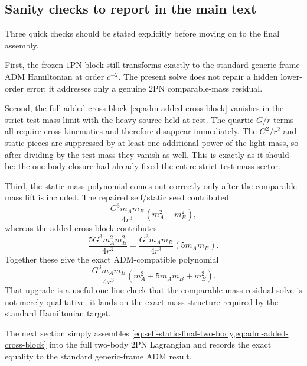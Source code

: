 \documentclass[11pt]{article}
\newcommand{\OnePN}{\mathrm{1PN}}
\newcommand{\TwoPN}{\mathrm{2PN}}
\newcommand{\ADM}{\mathrm{ADM}}
\begin{document}
\subsection{Sanity checks to report in the main text}
\label{sec:adm-sanity}

Three quick checks should be stated explicitly before moving on to the final assembly.

First, the frozen \(\OnePN\) block still transforms exactly to the standard generic-frame
\(\ADM\) Hamiltonian at order \(c^{-2}\).  The present solve does not repair a hidden
lower-order error; it addresses only a genuine \(\TwoPN\) comparable-mass residual.

Second, the full added cross block \cref{eq:adm-added-cross-block} vanishes in the
strict test-mass limit with the heavy source held at rest.  The quartic \(G/r\) terms
all require cross kinematics and therefore disappear immediately.  The
\(G^2/r^2\) and static pieces are suppressed by at least one additional power of the
light mass, so after dividing by the test mass they vanish as well.  This is exactly as
it should be: the one-body closure had already fixed the entire strict test-mass sector.

Third, the static mass polynomial comes out correctly only after the comparable-mass lift
is included.  The repaired self/static seed contributed
\begin{equation}
\frac{G^3m_A m_B}{4r^3}(m_A^2+m_B^2),
\label{eq:adm-static-seed-masspoly}
\end{equation}
whereas the added cross block contributes
\begin{equation}
\frac{5G^3m_A^2m_B^2}{4r^3}
=\frac{G^3m_A m_B}{4r^3}(5m_A m_B).
\label{eq:adm-static-cross-masspoly}
\end{equation}
Together these give the exact \(\ADM\)-compatible polynomial
\begin{equation}
\frac{G^3m_A m_B}{4r^3}(m_A^2+5m_A m_B+m_B^2).
\label{eq:adm-static-full-masspoly}
\end{equation}
That upgrade is a useful one-line check that the comparable-mass residual solve is not
merely qualitative; it lands on the exact mass structure required by the standard
Hamiltonian target.

The next section simply assembles
\cref{eq:self-static-final-two-body,eq:adm-added-cross-block} into the full two-body
\(\TwoPN\) Lagrangian and records the exact equality to the standard generic-frame
\(\ADM\) result.

\end{document}
